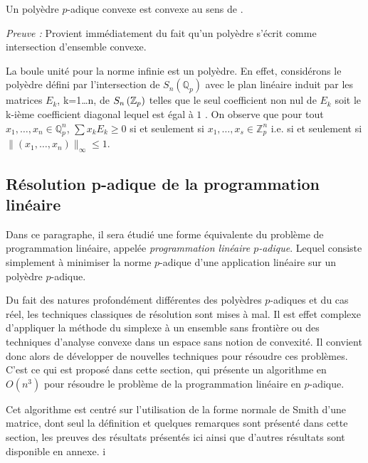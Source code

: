 \begin{propriete}
	Un polyèdre $p$-adique convexe est convexe au sens de \cite{monna_mo58_1958}.  
\end{propriete}

\textit{Preuve :} Provient immédiatement du fait qu'un polyèdre s'écrit comme intersection d'ensemble convexe.

\begin{ex}
	La boule unité pour la norme infinie est un polyèdre. En effet, considérons le polyèdre défini par l'intersection de $S_n\left( \mathbb{Q}_{ p }  \right) $ avec le plan linéaire induit par les matrices $E_k$, k=1\ldots n, de $S_n\left(  \mathbb {Z}_p  \right) $ telles que le seul coefficient non nul de $E_k$ soit le k-ième coefficient diagonal lequel est égal à $1$ . On observe que pour tout $x_1,\ldots,x_n \in \mathbb{Q}_{ p } ^n$, $\sum x_k E_k \ge 0$ si et seulement si $x_1,\ldots,x_s \in \mathbb{Z}_{ p }^n $ i.e. si et seulement si $\|(x_1,\ldots,x_n)\|_\infty \le 1$. 

\end{ex}

\subsection{Résolution \texorpdfstring{p}{$p$}-adique de la programmation linéaire}

Dans ce paragraphe, il sera étudié une forme équivalente du problème de programmation linéaire, appelée \textit{programmation linéaire $p$-adique}. Lequel consiste simplement à minimiser la norme $p$-adique d'une application linéaire sur un polyèdre $p$-adique. 

	Du fait des natures profondément différentes des polyèdres $p$-adiques et du cas réel, les techniques classiques de résolution sont mises à mal. Il est effet complexe d'appliquer la méthode du simplexe à un ensemble sans frontière ou des techniques d'analyse convexe dans un espace sans notion de convexité. Il convient donc alors de développer de nouvelles techniques pour résoudre ces problèmes. C'est ce qui est proposé dans cette section, qui présente un algorithme en $O(n^3)$  pour résoudre le problème de la programmation linéaire en $p$-adique.

	Cet algorithme est centré sur l'utilisation de la forme normale de Smith d'une matrice, dont seul la définition et quelques remarques sont présenté dans cette section, les preuves des résultats présentés ici ainsi que d'autres résultats sont disponible en annexe.  
i

